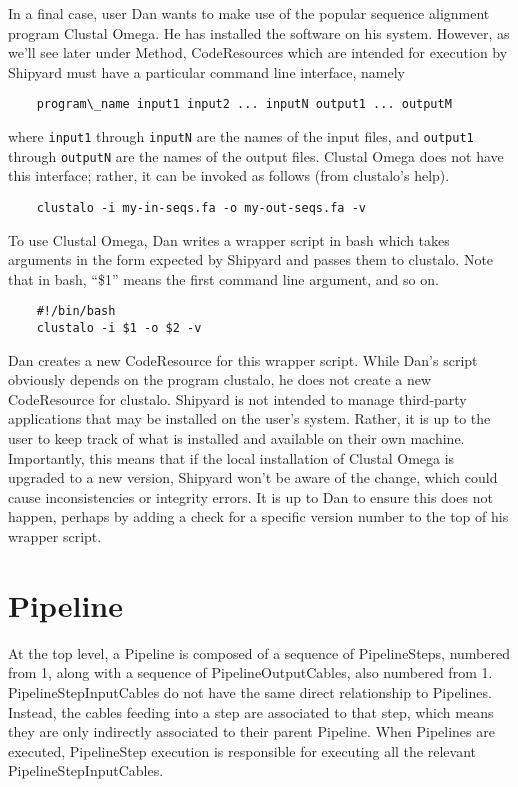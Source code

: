 \documentclass[12pt]{article}
\newcommand{\code}[1]{\texttt{#1}}
\begin{document}
In a final case, user Dan wants to make use of the popular sequence alignment
program Clustal Omega. He has installed the software on his system. However, as
we'll see later under Method, CodeResources which are intended for execution by
Shipyard must have a particular command line interface, namely
\begin{verbatim}
    program\_name input1 input2 ... inputN output1 ... outputM
\end{verbatim}
where \code{input1} through \code{inputN} are the names of the input files, and
\code{output1} through \code{outputN} are the names of the output files.
Clustal Omega does not have this interface; rather, it can be invoked as
follows (from clustalo's help).
\begin{verbatim}
    clustalo -i my-in-seqs.fa -o my-out-seqs.fa -v
\end{verbatim}
To use Clustal Omega, Dan writes a wrapper script in bash which takes arguments
in the form expected by Shipyard and passes them to clustalo. Note that in bash,
``\$1'' means the first command line argument, and so on.
\begin{verbatim}
    #!/bin/bash
    clustalo -i $1 -o $2 -v
\end{verbatim}
Dan creates a new CodeResource for this wrapper script. While Dan's script
obviously depends on the program clustalo, he does not create a new
CodeResource for clustalo. Shipyard is not intended to manage third-party
applications that may be installed on the user's system. Rather, it is up to
the user to keep track of what is installed and available on their own machine. 
Importantly, this means that if the local installation of Clustal Omega is
upgraded to a new version, Shipyard won't be aware of the change, which could
cause inconsistencies or integrity errors. It is up to Dan to ensure this does
not happen, perhaps by adding a check for a specific version number to the top
of his wrapper script.

\section*{Pipeline}

At the top level, a Pipeline is composed of a sequence of PipelineSteps,
numbered from 1, along with a sequence of PipelineOutputCables, also numbered
from 1. PipelineStepInputCables do not have the same direct relationship to
Pipelines. Instead, the cables feeding into a step are associated to that step,
which means they are only indirectly associated to their parent Pipeline. When
Pipelines are executed, PipelineStep execution is responsible for executing all
the relevant PipelineStepInputCables.
\end{document}
